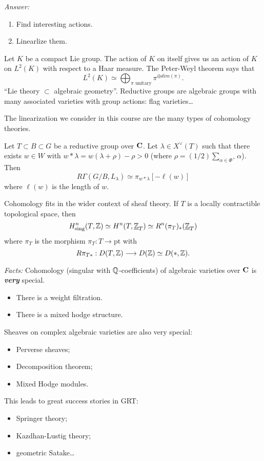 \emph{Answer:}
\begin{enumerate}[1)]
	\item Find interesting actions.
	\item Linearlize them.
\end{enumerate}

\begin{example}
	Let $K$ be a compact Lie group. The action of $K$ on itself gives us an action of $K$ on $L^2(K)$ with respect to a Haar measure. The Peter-Weyl theorem says that
	\[
	L^2(K) \simeq \bigoplus_{\pi\text{ unitary}}\pi^{\oplus dim(\pi)}.
	\]
	``Lie theory $\subset $ algebraic geometry''. Reductive groups are algebraic groups with many associated varieties with group actions: flag varieties\dots
\end{example}
The linearization we consider in this course are the many types of cohomology theories.

\begin{example}
	Let $T\subset B\subset G$ be a reductive group over $\mathbf{C}$. Let $\lambda\in X^{\vee}(T)$ such that there exists $w\in W$ with $w*\lambda = w(\lambda+\rho)-\rho>0$ (where $\rho = (1 /2)\sum_{\alpha\in \Phi^{+}}\alpha$). Then
	\[
		R\Gamma(G /B,L_\lambda) \simeq \pi_{w*\lambda}[-\ell(w)]
	\] 
	where $\ell(w)$ is the length of $w$.
\end{example}
Cohomology fits in the wider context of sheaf theory. If $T$ is a locally contractible topological space, then
\[
	H^{n}_{\text{sing}}(T,\mathbb Z) \simeq H^{n}(T,\underline{\mathbb{Z}}_T) \simeq R^{n}(\pi_T)_*(\underline{\mathbb{Z}}_T)	
\]
where $\pi_T$ is the morphism $\pi_T:T\to \text{pt}$ with
\[
R\pi_{T*}:D(T,\Z) \to D(\Z) \simeq D(*,\Z)
.\] 

\emph{Facts:} Cohomology (singular with $\mathbb Q$-coefficients) of algebraic varieties over $\mathbf{C}$ is \emph{\textbf{very}} special.
\begin{itemize}
	\item There is a weight filtration.
	\item There is a mixed hodge structure.
\end{itemize}
Sheaves on complex algebraic varieties are also very special:
\begin{itemize}
	\item Perverse sheaves;
	\item Decomposition theorem;
	\item Mixed Hodge modules.
\end{itemize}

This leads to great success stories in GRT:
\begin{itemize}
	\item Springer theory;
	\item Kazdhan-Lustig theory;
	\item geometric Satake\dots
\end{itemize}

